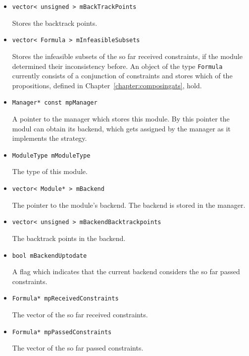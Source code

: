 \begin{itemize}
	\item \begin{verbatim}vector< unsigned > mBackTrackPoints\end{verbatim}
		Stores the backtrack points.
	\item \begin{verbatim}vector< Formula > mInfeasibleSubsets\end{verbatim}
		Stores the infeasible subsets of the so far received constraints, if the module determined their
		inconsistency before. An object of the type \texttt{Formula} currently consists
		of a conjunction of constraints and stores which of the propositions, defined in
		Chapter~\ref{chapter:composingats}, hold.
	\item \begin{verbatim}Manager* const mpManager\end{verbatim}
		A pointer to the manager which stores this module. By this pointer the modul can obtain
		its backend, which gets assigned by the manager as it implements the strategy.
	\item \begin{verbatim}ModuleType mModuleType\end{verbatim}
		The type of this module.
	\item \begin{verbatim}vector< Module* > mBackend\end{verbatim}
		The pointer to the module's backend. The backend is stored in the manager.
	\item \begin{verbatim}vector< unsigned > mBackendBacktrackpoints\end{verbatim}
		The backtrack points in the backend.
	\item \begin{verbatim}bool mBackendUptodate\end{verbatim}
		A flag which indicates that the current backend considers the so
		far passed constraints.
	\item \begin{verbatim}Formula* mpReceivedConstraints\end{verbatim}
		The vector of the so far received constraints.
	\item \begin{verbatim}Formula* mpPassedConstraints\end{verbatim}
		The vector of the so far passed constraints.
\end{itemize}

